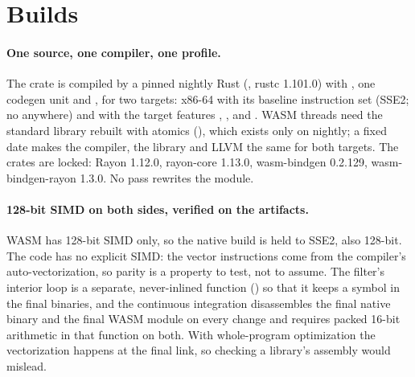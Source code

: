 \section{Builds}
\label{sec:builds}

\paragraph{One source, one compiler, one profile.} The crate is compiled by
a pinned nightly Rust (, rustc 1.101.0) with
, one codegen unit and , for two
targets: x86-64 with its baseline instruction set (SSE2; no
 anywhere) and  with the target
features , ,  and
. WASM threads need the standard library rebuilt with
atomics (), which exists only on nightly; a fixed date
makes the compiler, the library and LLVM the same for both targets. The
crates are locked: Rayon 1.12.0, rayon-core 1.13.0, wasm-bindgen 0.2.129,
wasm-bindgen-rayon 1.3.0. No  pass rewrites the module.

\paragraph{128-bit SIMD on both sides, verified on the artifacts.} WASM has
128-bit SIMD only, so the native build is held to SSE2, also 128-bit. The
code has no explicit SIMD: the vector instructions come from the compiler's
auto-vectorization, so parity is a property to test, not to assume. The
filter's interior loop is a separate, never-inlined function
() so that it keeps a symbol in the final binaries, and
the continuous integration disassembles the final native binary and the
final WASM module on every change and requires packed 16-bit arithmetic in
that function on both. With whole-program optimization the vectorization
happens at the final link, so checking a library's assembly would mislead.

